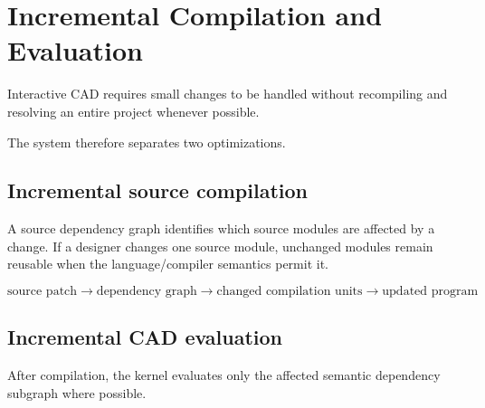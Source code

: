 \documentclass[11pt,a4paper]{article}
\begin{document}
\section{Incremental Compilation and Evaluation}

Interactive CAD requires small changes to be handled without recompiling and resolving an entire project whenever possible.

The system therefore separates two optimizations.

\subsection{Incremental source compilation}

A source dependency graph identifies which source modules are affected by a change. If a designer changes one source module, unchanged modules remain reusable when the language/compiler semantics permit it.

\[
\text{source patch}
\rightarrow
\text{dependency graph}
\rightarrow
\text{changed compilation units}
\rightarrow
\text{updated program}
\]

\subsection{Incremental CAD evaluation}

After compilation, the kernel evaluates only the affected semantic dependency subgraph where possible.

\begin{center}
\end{center}
\end{document}
